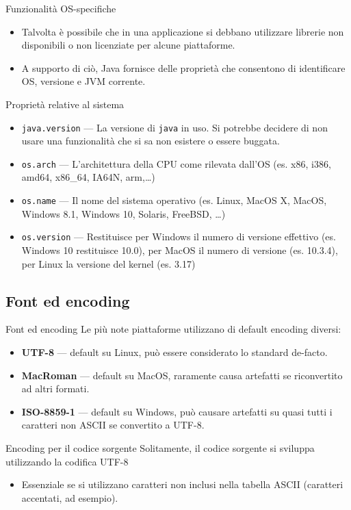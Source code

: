 \documentclass[presentation]{beamer}
\begin{document}
\begin{frame}{Funzionalità OS-specifiche}
\begin{itemize}\itemsep10pt
\item Talvolta è possibile che in una applicazione si debbano utilizzare librerie non disponibili o non licenziate per alcune piattaforme.
\item A supporto di ciò, Java fornisce delle proprietà che consentono di identificare OS, versione e JVM corrente.
\end{itemize}

\begin{block}{Proprietà relative al sistema}
\begin{itemize}
\item \texttt{java.version} --- La versione di \texttt{java} in uso. Si potrebbe decidere di non usare una funzionalità che si sa non esistere o essere buggata.

\item \texttt{os.arch} --- L'architettura della CPU come rilevata dall'OS (es. x86, i386, amd64, x86\_64, IA64N, arm,\dots)

\item \texttt{os.name} --- Il nome del sistema operativo (es. Linux, MacOS X, MacOS, Windows 8.1, Windows 10, Solaris, FreeBSD, \dots)

\item \texttt{os.version} --- Restituisce per Windows il numero di versione effettivo (es. Windows 10 restituisce 10.0), per MacOS il numero di versione (es. 10.3.4), per Linux la versione del kernel (es. 3.17)
\end{itemize}
\end{block}

\end{frame}


\subsection{Font ed encoding}

\begin{frame}{Font ed encoding}
	Le più note piattaforme utilizzano di default encoding diversi:
	\begin{itemize}
		\item \textbf{UTF-8} --- default su Linux, può essere considerato lo standard de-facto.
		\item \textbf{MacRoman} --- default su MacOS, raramente causa artefatti se riconvertito ad altri formati.
		\item \textbf{ISO-8859-1} --- default su Windows, può causare artefatti su quasi tutti i caratteri non ASCII se convertito a UTF-8.
	\end{itemize}
	\begin{block}{Encoding per il codice sorgente}
		Solitamente, il codice sorgente si sviluppa utilizzando la codifica UTF-8
		\begin{itemize}
			\item Essenziale se si utilizzano caratteri non inclusi nella tabella ASCII (caratteri accentati, ad esempio).
		\end{itemize}
	\end{block}
\end{frame}
\end{document}
